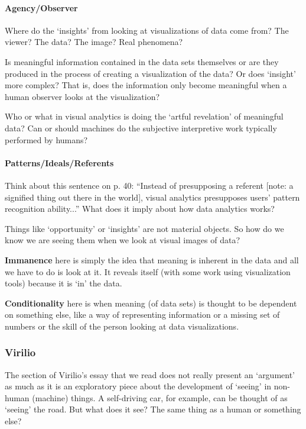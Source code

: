 \documentclass[a4paper]{article}
\begin{document}
\paragraph{Agency/Observer}\mbox{}

\medskip
\noindent Where do the `insights' from looking at visualizations of data come from? The viewer? The data? The image? Real phenomena?

\medskip
\noindent Is meaningful information contained in the data sets themselves or are they produced in the process of creating a visualization of the data? Or does `insight' more complex? That is, does the information only become meaningful when a human observer looks at the visualization? 

\medskip
\noindent Who or what in visual analytics is doing the `artful revelation' of meaningful data? Can or should machines do the subjective interpretive work typically performed by humans?

\paragraph{Patterns/Ideals/Referents}\mbox{}

\medskip
\noindent Think about this sentence on p. 40: ``Instead of presupposing a referent [note: a signified thing out there in the world], visual analytics presupposes users' pattern recognition ability...'' What does it imply about how data analytics works?

\medskip
\noindent Things like `opportunity' or `insights' are not material objects. So how do we know we are seeing them when we look at visual images of data? 

\medskip
\noindent\textbf{Immanence} here is simply the idea that meaning is inherent in the data and all we have to do is look at it. It reveals itself (with some work using visualization tools) because it is `in' the data.

\medskip
\noindent\textbf{Conditionality} here is when meaning (of data sets) is thought to be dependent on something else, like a way of representing information or a missing set of numbers or the skill of the person looking at data visualizations.

\subsubsection{Virilio}
The section of Virilio's essay that we read does not really present an `argument' as much as it is an exploratory piece about the development of `seeing' in non-human (machine) things. A self-driving car, for example, can be thought of as `seeing' the road. But what does it see? The same thing as a human or something else?
\end{document}

